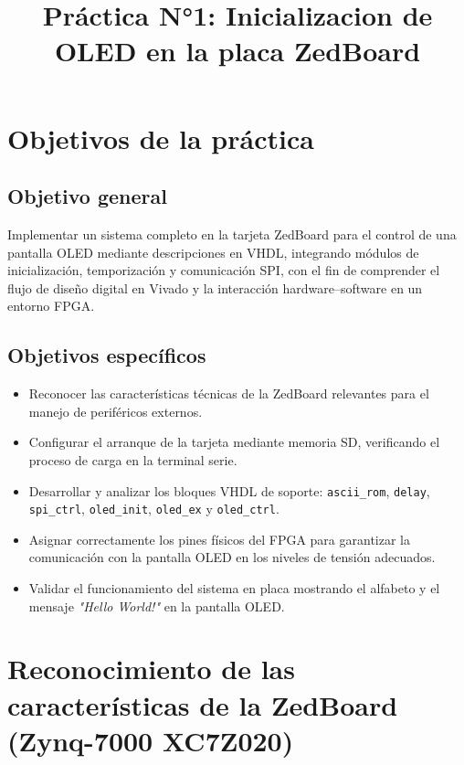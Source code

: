 \documentclass[a4paper,12pt]{article}
\title{Práctica N°1: Inicializacion de OLED en la placa ZedBoard}
\date{}
\begin{document}
\maketitle
\tableofcontents
\newpage

\section{Objetivos de la práctica}
\label{sec:objetivos}

\subsection{Objetivo general}
Implementar un sistema completo en la tarjeta ZedBoard para el control de una pantalla OLED mediante descripciones en VHDL, integrando módulos de inicialización, temporización y comunicación SPI, con el fin de comprender el flujo de diseño digital en Vivado y la interacción hardware–software en un entorno FPGA.

\subsection{Objetivos específicos}
\begin{itemize}
  \item Reconocer las características técnicas de la ZedBoard relevantes para el manejo de periféricos externos.
  \item Configurar el arranque de la tarjeta mediante memoria SD, verificando el proceso de carga en la terminal serie.
  \item Desarrollar y analizar los bloques VHDL de soporte: \texttt{ascii\_rom}, \texttt{delay}, \texttt{spi\_ctrl}, \texttt{oled\_init}, \texttt{oled\_ex} y \texttt{oled\_ctrl}.
  \item Asignar correctamente los pines físicos del FPGA para garantizar la comunicación con la pantalla OLED en los niveles de tensión adecuados.
  \item Validar el funcionamiento del sistema en placa mostrando el alfabeto y el mensaje \emph{"Hello World!"} en la pantalla OLED.
\end{itemize}


\section{Reconocimiento de las características de la ZedBoard (Zynq-7000 XC7Z020)}
\label{sec:zedboard_caracteristicas}
\end{document}
